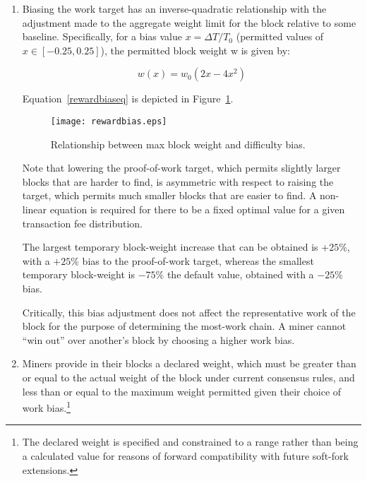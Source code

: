 \begin{enumerate}
\begin{enumerate}
  \item

    Biasing the work target has an inverse-quadratic relationship with
    the adjustment made to the aggregate weight limit for the block
    relative to some baseline.  Specifically, for a bias value $x =
    \Delta T / T_0$ (permitted values of $x \in [-0.25, 0.25]$), the
    permitted block weight w is given by:

    \begin{equation} \label{rewardbiaseq}
      w(x) = w_0(2x - 4x^2)
    \end{equation}

    Equation~\eqref{rewardbiaseq} is depicted in
    Figure~\ref{rewardbiasfig}.


\begin{figure}
  \centering
  \texttt{[image: rewardbias.eps]}
  \caption{Relationship between max block weight and difficulty bias.}
  \label{rewardbiasfig}
\end{figure}

Note that lowering the proof-of-work target, which permits slightly
larger blocks that are harder to find, is asymmetric with respect to
raising the target, which permits much smaller blocks that are easier
to find.  A non-linear equation is required for there to be a fixed
optimal value for a given transaction fee distribution.

The largest temporary block-weight increase that can be obtained is
+$25\%$, with a $+25\%$ bias to the proof-of-work target, whereas the
smallest temporary block-weight is $-75\%$ the default value, obtained
with a $-25\%$ bias.

Critically, this bias adjustment does not affect the representative
work of the block for the purpose of determining the most-work
chain. A miner cannot ``win out'' over another's block by choosing a
higher work bias.


  \item

    Miners provide in their blocks a declared weight, which must be
    greater than or equal to the actual weight of the block under
    current consensus rules, and less than or equal to the maximum
    weight permitted given their choice of work bias.\footnote{The
    declared weight is specified and constrained to a range rather
    than being a calculated value for reasons of forward compatibility
    with future soft-fork extensions.}


\end{enumerate}
\end{enumerate}
